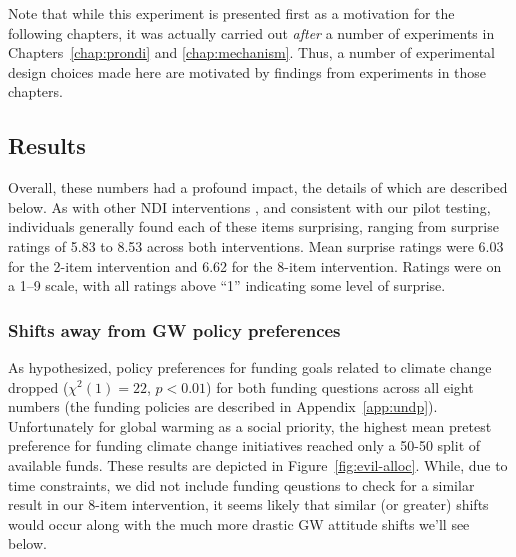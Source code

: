 Note that while this experiment is presented first as a motivation for the
following chapters, it was actually carried out \emph{after} a number of
experiments in Chapters~\ref{chap:prondi} and \ref{chap:mechanism}. Thus, a
number of experimental design choices made here are motivated by findings from
experiments in those chapters.

\subsection{Results}

Overall, these numbers had a profound impact, the details of which are described
below. As with other NDI interventions
\parencite[e.g.,][]{ranney_designing_2008}, and consistent with our pilot testing,
individuals generally found each of these items surprising, ranging from
surprise ratings of 5.83 to 8.53 across both interventions. Mean surprise
ratings were 6.03 for the 2-item intervention and 6.62 for the 8-item
intervention. Ratings were on a 1--9 scale, with all ratings above “1”
indicating some level of surprise.

\subsubsection{Shifts away from GW policy preferences}

As hypothesized, policy preferences for funding goals related to climate
change dropped ($\chi^2(1)=22$, $p<0.01$) for both funding questions across all
eight numbers (the funding policies are described in Appendix~\ref{app:undp}).
Unfortunately for global warming as a social priority, the highest mean pretest
preference for funding climate change initiatives reached only a 50-50 split of
available funds. These results are depicted in Figure~\ref{fig:evil-alloc}.
While, due to time constraints, we did not include funding qeustions to check
for a similar result in our 8-item intervention, it seems likely that similar
(or greater) shifts would occur along with the much more drastic GW attitude
shifts we'll see below.

